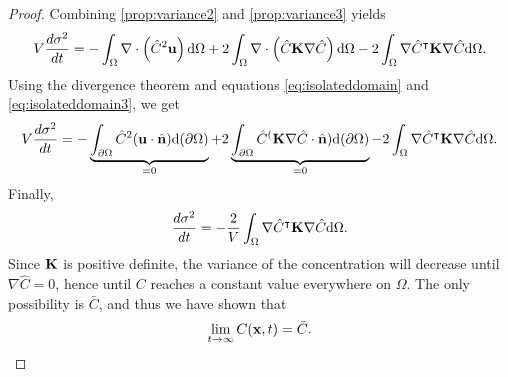 \begin{proof}
	 Combining \eqref{prop:variance2} and \eqref{prop:variance3} yields
	 \begin{equation}
	 	V\frac{d\sigma^2}{dt} = - \int_{\Omega} \nabla \cdot \left(\hat C^2 \mathbf u \right) \mathrm d\Omega + 2 \int_{\Omega} \nabla \cdot \left(\hat C \mathbf K \nabla \hat C \right) \mathrm d\Omega -2 \int_{\Omega} \nabla \hat C^\intercal \mathbf K \nabla \hat C \mathrm d\Omega.
	 \end{equation}
	 Using the divergence theorem and equations \eqref{eq:isolateddomain} and \eqref{eq:isolateddomain3}, we get
	 \begin{equation}
	 		V\frac{d\sigma^2}{dt} = - \underbrace{\int_{\partial \Omega} \hat C^2 (\mathbf u \cdot \hat{\mathbf n}) \mathrm d(\partial \Omega)}_{=0} + 2\underbrace{\int_{\partial \Omega} \hat C^ (\mathbf K \nabla \hat C \cdot \hat{\mathbf n}) \mathrm d(\partial \Omega)}_{=0} -2 \int_{\Omega} \nabla \hat C^\intercal \mathbf K \nabla \hat C \mathrm d\Omega.
	 \end{equation}
	 Finally,
	 \begin{equation}
	 	\frac{d\sigma^2}{dt} = -\frac{2}{V} \int_{\Omega} \nabla \hat C^\intercal \mathbf K \nabla \hat C \mathrm d\Omega.
	 \end{equation}
	 Since $\mathbf K$ is positive definite, the variance of the concentration will decrease until $\nabla \hat C = 0$, hence until $C$ reaches a constant value everywhere on $\Omega$. The only possibility is $\bar C$, and thus we have shown that
	 \begin{equation}
	 	\lim_{t\rightarrow \infty} C(\mathbf x,t) = \bar C.
	 \end{equation}
\end{proof}